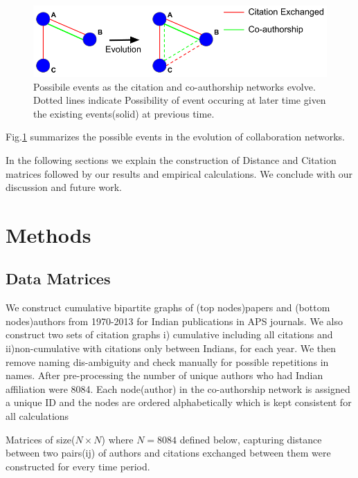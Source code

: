 \documentclass[aps, pre, twocolumn, nofootinbib]{revtex4-1}
\begin{document}
\begin{figure}
	\centering
	\includegraphics[scale = 0.28]{plots/goals}
	
	\captionsetup{singlelinecheck=false, justification=raggedright,  labelsep=space}
	\caption{Possibile events as the citation and co-authorship networks evolve. Dotted lines indicate Possibility of event occuring at later time given the existing events(solid) at previous time.}
	\label{f1}
\end{figure}

Fig.\ref{f1} summarizes the possible events in the evolution of collaboration networks. 

In the following sections we explain the construction of Distance and Citation matrices followed by our results and empirical calculations. We conclude with our discussion and future work.

\section{Methods}

\subsection{Data Matrices}

We construct cumulative bipartite graphs of (top nodes)papers and (bottom nodes)authors from 1970-2013 for Indian publications in APS journals. We also construct two sets of citation graphs i) cumulative including all citations and ii)non-cumulative with citations only between Indians, for each year. We then remove naming dis-ambiguity and check manually for possible repetitions in names. After pre-processing the number of unique authors who had Indian affiliation were 8084. Each node(author) in the co-authorship network is assigned a unique ID and the nodes are ordered alphabetically which is kept consistent for all calculations

Matrices of size($N\times N$) where $N = 8084$ defined below, capturing distance between two pairs(ij) of authors and citations exchanged between them were constructed for every time period.
\end{document}
